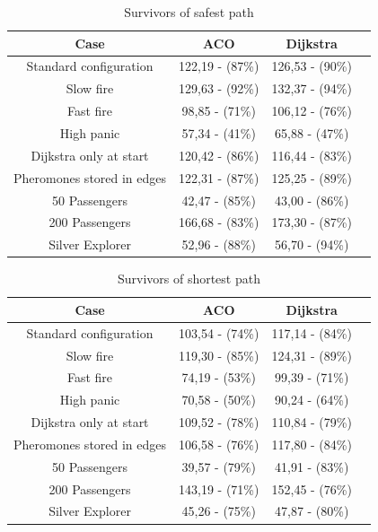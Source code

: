 \begin{table}[ht]
\caption{Survivors of safest path} 				%
\centering										%
\begin{tabular}{c c c c}						%
\hline
\hline 											%
Case & ACO & Dijkstra \\[0.5ex]%
\hline											%
Standard configuration & 122,19 - (87\%) & 126,53 - (90\%) \\
Slow fire & 129,63 - (92\%) & 132,37 - (94\%) \\
Fast fire & 98,85 - (71\%) & 106,12 - (76\%) \\
High panic & 57,34 - (41\%) & 65,88 - (47\%) \\
Dijkstra only at start & 120,42 - (86\%) & 116,44 - (83\%) \\
Pheromones stored in edges & 122,31 - (87\%) & 125,25 - (89\%) \\
50 Passengers & 42,47 - (85\%) & 43,00 - (86\%) \\
200 Passengers & 166,68 - (83\%) & 173,30 - (87\%) \\ 
Silver Explorer & 52,96 - (88\%) & 56,70 - (94\%) \\ [1ex]						%
\hline														%

\end{tabular}
\label{table:tableSafest}								
\end{table}


\begin{table}[ht]
\caption{Survivors of shortest path} 				%
\centering										%
\begin{tabular}{c c c c}						%
\hline
\hline 											%
Case & ACO & Dijkstra \\[0.5ex]%
\hline											%
Standard configuration & 103,54 - (74\%) & 117,14 - (84\%)\\
Slow fire & 119,30 - (85\%) & 124,31 - (89\%) \\
Fast fire & 74,19 - (53\%) & 99,39 - (71\%) \\
High panic & 70,58 - (50\%) & 90,24 - (64\%) \\
Dijkstra only at start & 109,52 - (78\%) & 110,84 - (79\%) \\
Pheromones stored in edges & 106,58 - (76\%) & 117,80 - (84\%) \\
50 Passengers & 39,57 - (79\%) & 41,91 - (83\%) \\ 
200 Passengers & 143,19 - (71\%) & 152,45 - (76\%) \\
Silver Explorer & 45,26 - (75\%) & 47,87 - (80\%) \\ [1ex]						%
\hline														%

\end{tabular}
\label{table:tableShortest}								
\end{table}